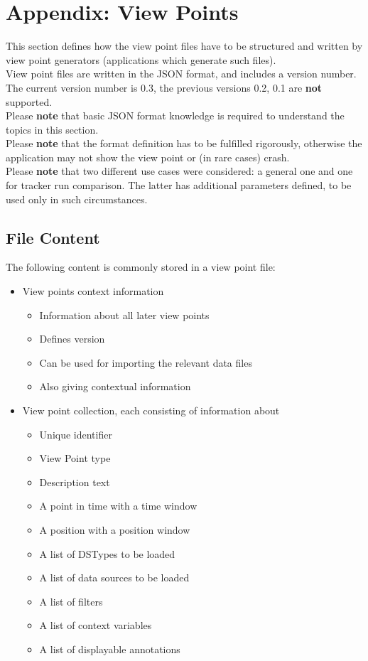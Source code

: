 \section{Appendix: View Points}
\label{sec:appendix_view_points} 

This section defines how the view point files have to be structured and written by view point generators (applications which generate such files). \\

View point files are written in the JSON format, and includes a version number. The current version number is 0.3, the previous versions 0.2, 0.1 are \textbf{not} supported. \\

Please \textbf{note} that basic JSON format knowledge is required to understand the topics in this section. \\

Please \textbf{note} that the format definition has to be fulfilled rigorously, otherwise the application may not show the view point or (in rare cases) crash. \\

Please \textbf{note} that two different use cases were considered: a general one and one for tracker run comparison. The latter has additional parameters defined, to be used only in such circumstances.

\subsection{File Content}

The following content is commonly stored in a view point file:
 \begin{itemize}
 \item View points context information
 \begin{itemize}
 \item Information about all later view points
 \item Defines version
 \item Can be used for importing the relevant data files
 \item Also giving contextual information
 \end{itemize}
 \item View point collection, each consisting of information about
 \begin{itemize}
 \item Unique identifier
 \item View Point type
 \item Description text
 \item A point in time with a time window
 \item A position with a position window
 \item A list of DSTypes to be loaded
 \item A list of data sources to be loaded
 \item A list of filters
 \item A list of context variables
 \item A list of displayable annotations
  \end{itemize}
 \end{itemize}

